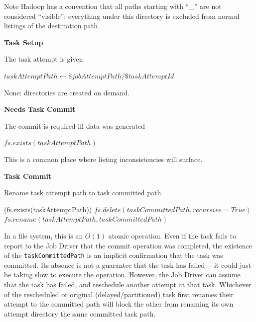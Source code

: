 \documentclass[conference]{IEEEtran}
\begin{document}
Note Hadoop has a convention that all paths starting with ``\_'' are not considered
``visible'';
everything under this directory is excluded from normal
listings of the destination path.


\textbf{Task Setup}

The task attempt is given

\begin{algorithmic}
  \STATE $taskAttemptPath \leftarrow \$jobAttemptPath/\$taskAttemptId$
\end{algorithmic}

None: directories are created on demand.


\textbf{Needs Task Commit}

The commit is required iff data was generated

\begin{algorithmic}
  \RETURN $fs.exists(taskAttemptPath)$
\end{algorithmic}

This is a common place where listing inconsistencies will surface.


\textbf{Task Commit}

Rename task attempt path to task committed path.



\begin{algorithmic}
  \IF (fs.exists(taskAttemptPath))
  $fs.delete(taskCommittedPath, recursive=True)$
  $fs.rename(taskAttemptPath, taskCommittedPath)$
  \ENDIF
\end{algorithmic}

In a file system, this is an $O(1)$ atomic operation.
Even if the task fails to report to the Job Driver that the
commit operation was completed, the existence of the \texttt{taskCommittedPath}
is an implicit confirmation that the task was committed.
Its absence is not a guarantee that the task has failed ---it could just
be taking slow to execute the operation.
However, the Job Driver can assume that the task has failed,
and reschedule another attempt at that task.
Whichever of the rescheduled or original (delayed/partitioned) task
first renames their attempt to the committed path will block the other
from renaming its own attempt directory the same committed task path.
\end{document}

